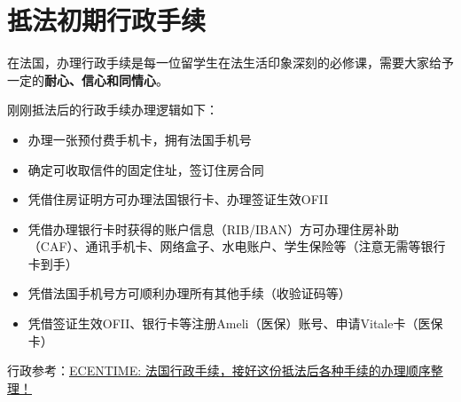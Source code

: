 \section{抵法初期行政手续}

在法国，办理行政手续是每一位留学生在法生活印象深刻的必修课，需要大家给予一定的\textbf{耐心、信心和同情心}。

刚刚抵法后的行政手续办理逻辑如下：
\begin{itemize}
    \item 办理一张预付费手机卡，拥有法国手机号
    \item 确定可收取信件的固定住址，签订住房合同
    \item 凭借住房证明方可办理法国银行卡、办理签证生效OFII
    \item 凭借办理银行卡时获得的账户信息（RIB/IBAN）方可办理住房补助（CAF）、通讯手机卡、网络盒子、水电账户、学生保险等（注意无需等银行卡到手）
    \item 凭借法国手机号方可顺利办理所有其他手续（收验证码等）
    \item 凭借签证生效OFII、银行卡等注册Ameli（医保）账号、申请Vitale卡（医保卡）
\end{itemize}

行政参考：\href{https://www.ecentime.com/article/demarches-etudiant-arrivant}{ECENTIME: 法国行政手续，接好这份抵法后各种手续的办理顺序整理！}
 

















